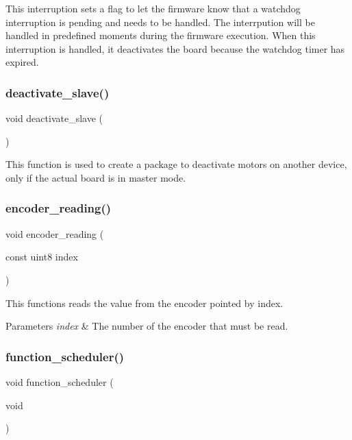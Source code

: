 This interruption sets a flag to let the firmware know that a watchdog interruption is pending and needs to be handled. The interrpution will be handled in predefined moments during the firmware execution. When this interruption is handled, it deactivates the board because the watchdog timer has expired. \mbox{\label{interruptions_8h_a71cb50f2e34246bbedd5918da1b6ef5e}} 
\subsubsection{deactivate\+\_\+slave()}
{\footnotesize\ttfamily void deactivate\+\_\+slave (\begin{DoxyParamCaption}{ }\end{DoxyParamCaption})}

This function is used to create a package to deactivate motors on another device, only if the actual board is in master mode. \mbox{\label{interruptions_8h_a02aa2fd33f7b2f645490b9c7642084d7}} 
\subsubsection{encoder\+\_\+reading()}
{\footnotesize\ttfamily void encoder\+\_\+reading (\begin{DoxyParamCaption}\item[{const uint8}]{index }\end{DoxyParamCaption})}

This functions reads the value from the encoder pointed by index.


\begin{DoxyParams}{Parameters}
{\em index} & The number of the encoder that must be read. \\
\hline
\end{DoxyParams}
\mbox{\label{interruptions_8h_a39df971c4e9f194be50c54dfd7aeabfe}} 
\subsubsection{function\+\_\+scheduler()}
{\footnotesize\ttfamily void function\+\_\+scheduler (\begin{DoxyParamCaption}\item[{void}]{ }\end{DoxyParamCaption})}


